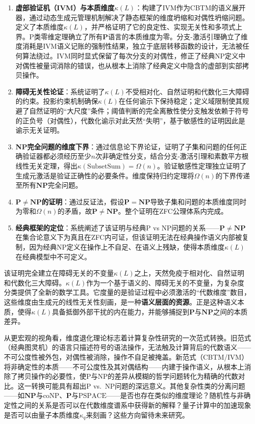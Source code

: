 \documentclass{ctexart}
\begin{document}
	\begin{enumerate}
		\item \textbf{虚部验证机（IVM）与本质维度$\kappa(L)$}：构建了IVM作为CBTM的语义展开器，通过动态生成元管理机制解决了静态框架的维度坍缩和对偶性坍缩问题。定义了本质维度$\kappa(L)$，并严格证明了它的良定性、实现无关性和多项式上界。P类零维定理确立了所有$\mathbf{P}$语言的本质维度为零。分支-激活引理确立了维度消耗是IVM语义记账的强制性结果，独立于底层转移函数的设计，无法被任何算法绕过。IVM同时显式保留了每次分支的对偶性，修正了经典NP定义中对偶性被量词消除的错误，也从根本上消除了经典定义中隐含的虚部到实部拷贝操作。
		\item \textbf{障碍无关性论证}：系统证明了$\kappa(L)$不受相对化、自然证明和代数化三大障碍的约束。投影约束机制确保$\kappa(L)$在任何谕示下保持稳定；定义域限制使其规避了自然证明的``大尺度''条件；阈值判断的完全离散性使分支触发依赖于符号的正负号（对偶性），代数化谕示对此天然``失明''，基于敏感性的证明因此是谕示无关证明。
		\item \textbf{NP完全问题的维度下界}：通过信息论下界论证，证明了子集和问题的任何正确验证器都必须经历至少$n$次非确定性分支，结合分支-激活引理和素数平方根线性无关定理，得出$\kappa(\mathrm{SubsetSum}) = \Omega(n)$。验证敏感性定理独立证明了生成元激活是验证正确性的必要条件。维度保持归约定理将$\Omega(n)$的下界传递至所有$\mathbf{NP}$完全问题。
		\item \textbf{$\mathbf{P} \neq \mathbf{NP}$的证明}：通过反证法，假设$\mathbf{P} = \mathbf{NP}$导致子集和问题的本质维度同时为零和$\Omega(n)$的矛盾，故$\mathbf{P} \neq \mathbf{NP}$。整个证明在ZFC公理体系内完成。
		\item \textbf{经典框架的定位}：系统阐述了该证明与经典P vs NP问题的关系——$\mathbf{P}\neq\mathbf{NP}$在集合论意义下为真且在ZFC内可证，但该证明无法在经典操作语义内部被复制，因为经典NP定义在操作上不自足、在语义上残缺，使得本质维度$\kappa(L)$在经典模型中不可定义。
	\end{enumerate}
	
	该证明完全建立在障碍无关的不变量$\kappa(L)$之上，天然免疫于相对化、自然证明和代数化三大障碍。$\kappa(L)$作为一个基于语义的、障碍无关的不变量，为复杂度分类提供了全新的数学工具。它度量的是验证过程中必须激活的``代数维度''数目，这些维度由生成元的线性无关性刻画，是一种\textbf{语义层面的资源}。正是这种语义本质，使得$\kappa(L)$具备抵御外部干扰的内在能力，并能够捕捉到$\mathbf{P}$与$\mathbf{NP}$之间的本质差异。
	
	从更宏观的视角看，维度退化理论标志着计算复杂性研究的一次范式转换。旧范式（经典图灵机）的语言只描述符号的语法操作，无法触及计算背后的代数语义——不可公度性被外包，对偶性被消除，操作不自足被掩盖。新范式（CBTM/IVM）将非确定性的本质——不可公度性及其对偶结构——内建于操作语义，从根本上消除了拷贝操作的必要性，使P与NP的差异从模糊的哲学问题转化为精确的代数对比。这一转换可能具有超出P vs.\ NP问题的深远意义。其他复杂性类的分离问题——如$\mathbf{NP}$与$\mathrm{coNP}$、$\mathbf{P}$与$\mathrm{PSPACE}$——是否也存在类似的维度理论？随机性与非确定性之间的关系是否可以在代数维度谱系中获得新的解释？量子计算中的加速现象是否可以由量子本质维度$\kappa_q$来刻画？这些方向留待未来研究。
	
\end{document}
